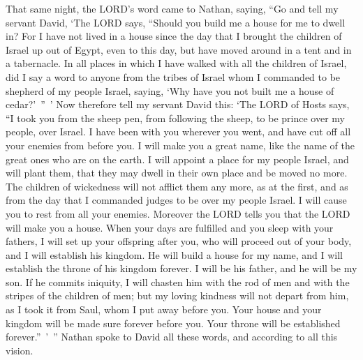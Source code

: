 \myverse{}That same night, the LORD’s word came to Nathan, saying,
\myverse{}“Go and tell my servant David, ‘The LORD says, “Should you build me a house
for me to dwell in?
\myverse{}For I have not lived in a house since the day that I brought the children of
Israel up out of Egypt, even to this day, but have moved around in a tent and in a tabernacle.
\myverse{}In all places in which I have walked with all the children of Israel, did I
say a word to anyone from the tribes of Israel whom I commanded to be shepherd of my people Israel, saying,
‘Why have you not built me a house of cedar?’ ” ’
\myverse{}Now therefore tell my servant David this: ‘The LORD of Hosts says, “I took you
from the sheep pen, from following the sheep, to be prince over my people, over Israel.
\myverse{}I have been with you wherever you went, and have cut off all your enemies from
before you. I will make you a great name, like the name of the great ones who are on the earth.
\myverse{}I will appoint a place for my people Israel, and will plant them, that they
may dwell in their own place and be moved no more. The children of wickedness will not afflict them any
more, as at the first,
\myverse{}and as from the day that I commanded judges to be over my people Israel. I
will cause you to rest from all your enemies. Moreover the LORD tells you that the LORD will make you
a house.
\myverse{}When your days are fulfilled and you sleep with your fathers, I will set up
your offspring after you, who will proceed out of your body, and I will establish his kingdom.
\myverse{}He will build a house for my name, and I will establish the throne of his
kingdom forever.
\myverse{}I will be his father, and he will be my son. If he commits iniquity, I will
chasten him with the rod of men and with the stripes of the children of men;
\myverse{}but my loving kindness will not depart from him, as I took it from Saul, whom
I put away before you.
\myverse{}Your house and your kingdom will be made sure forever before you. Your throne
will be established forever.” ’ ”
\myverse{}Nathan spoke to David all these words, and according to all this vision.

